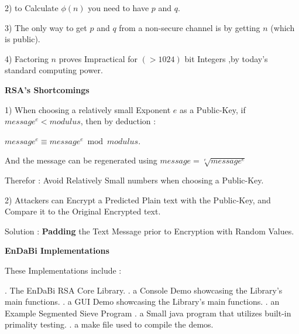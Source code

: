 \documentclass{slides}
\begin{document}
\begin{center}
2) to Calculate $ \phi(n) $ you  need to have $ p $ and $ q $.
\end{center}
\begin{center}
3) The only way to get $ p $ and $ q $ from a non-secure channel is by getting $ n $ (which is public).
\end{center}
\begin{center}
4) Factoring $ n $ proves Impractical for $ (>1024) $ bit Integers ,by today's standard computing power.
\end{center}
\newpage
\begin{center}
\textbf{\Large RSA's Shortcomings}
\end{center}
\begin{center}
1) When choosing a relatively small Exponent $ e $ as a Public-Key, if $ message^{e} < modulus $, then by deduction :

 $message^{e} \equiv message^{e} \bmod modulus $.

And the message can be regenerated using $ message = \sqrt[e]{message^{e}} $ 

Therefor : Avoid Relatively Small numbers when choosing a Public-Key.
\end{center}
\begin{center}
2) Attackers can Encrypt a Predicted Plain text with the Public-Key, and Compare it to the Original Encrypted text.

Solution : \textbf{Padding} the Text Message prior to Encryption with Random Values.
\end{center}
\newpage
\begin{center}
\textbf{\Large EnDaBi Implementations}
\end{center}
\begin{center}
These Implementations include :
\end{center}
\begin{center}
. The EnDaBi RSA Core Library.
\newline . a Console Demo showcasing the Library's main functions.
\newline . a GUI Demo showcasing the Library's main functions.
\newline  . an Example Segmented Sieve Program
\newline . a Small java program that utilizes built-in primality testing.
\newline . a make file used to compile the demos.
\end{center}
\newpage

\end{document}
